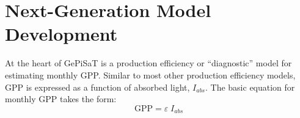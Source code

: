 %
%
%
%
%
\section{Next-Generation Model Development}
\label{nxtgen}
At the heart of GePiSaT is a production efficiency or ``diagnostic'' model for estimating monthly GPP. 
Similar to most other production efficiency models, GPP is expressed as a function of absorbed light, $I_{abs}$.
The basic equation for monthly GPP takes the form:
\begin{equation}
\label{eq:pem}
    \text{GPP} = \varepsilon\; I_{abs} 
\end{equation}

